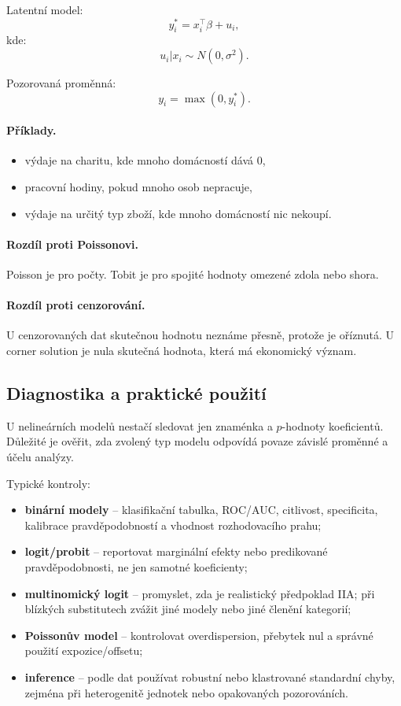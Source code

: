 Latentní model:
\[
y_i^*=x_i^\top\beta+u_i,
\]
kde:
\[
u_i|x_i\sim N(0,\sigma^2).
\]

Pozorovaná proměnná:
\[
y_i=\max(0,y_i^*).
\]

\paragraph{Příklady.}
\begin{itemize}
    \item výdaje na charitu, kde mnoho domácností dává 0,
    \item pracovní hodiny, pokud mnoho osob nepracuje,
    \item výdaje na určitý typ zboží, kde mnoho domácností nic nekoupí.
\end{itemize}

\paragraph{Rozdíl proti Poissonovi.}
Poisson je pro počty. Tobit je pro spojité hodnoty omezené zdola nebo shora.

\paragraph{Rozdíl proti cenzorování.}
U cenzorovaných dat skutečnou hodnotu neznáme přesně, protože je oříznutá. U corner solution je nula skutečná
hodnota, která má ekonomický význam.

\subsection{Diagnostika a praktické použití}

U nelineárních modelů nestačí sledovat jen znaménka a $p$-hodnoty koeficientů. Důležité je ověřit, zda
zvolený typ modelu odpovídá povaze závislé proměnné a účelu analýzy.

Typické kontroly:
\begin{itemize}
    \item \textbf{binární modely} -- klasifikační tabulka, ROC/AUC, citlivost, specificita, kalibrace
    pravděpodobností a vhodnost rozhodovacího prahu;
    \item \textbf{logit/probit} -- reportovat marginální efekty nebo predikované pravděpodobnosti, ne jen
    samotné koeficienty;
    \item \textbf{multinomický logit} -- promyslet, zda je realistický předpoklad IIA; při blízkých
    substitutech zvážit jiné modely nebo jiné členění kategorií;
    \item \textbf{Poissonův model} -- kontrolovat overdispersion, přebytek nul a správné použití
    expozice/offsetu;
    \item \textbf{inference} -- podle dat používat robustní nebo klastrované standardní chyby, zejména
    při heterogenitě jednotek nebo opakovaných pozorováních.
\end{itemize}

